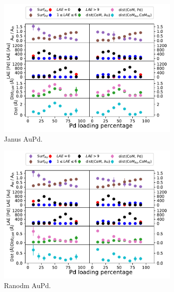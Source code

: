 \begin{figure}
    \centering
    \includegraphics[width=0.8\textwidth]{figures/MD/Alloys/Janus_Au-Pd.pdf}
    \caption{Janus AuPd.}
    \label{fig:AuPdJan_Dyn}
\end{figure}

\begin{figure}
    \centering
    \includegraphics[width=0.8\textwidth]{figures/MD/Alloys/Random_Au-Pd.pdf}
    \caption{Ranodm AuPd.}
    \label{fig:AuPdRnd_Dyn}
\end{figure}


